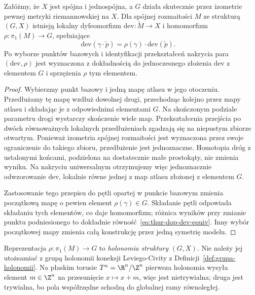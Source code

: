 \begin{twierdzenie}
\label{thm:thur-dop-dev-hol}
Załóżmy, że $X$ jest spójna i jednospójna, a $G$ działa
skutecznie przez izometrie pewnej metryki riemannowskiej
na $X$. Dla spójnej rozmaitości $M$ ze strukturą $(G,X)$
istnieją lokalny dyfeomorfizm
$\mathrm{dev}:\widetilde M\to X$ i homomorfizm
$\rho:\pi_1(M)\to G$, spełniające
\begin{equation}\label{eq:thur-dop-dev-equiv}
 \mathrm{dev}(\gamma\cdot\widetilde p)
 =\rho(\gamma)\cdot\mathrm{dev}(\widetilde p).
\end{equation}
Po wyborze punktów bazowych i identyfikacji przekształceń
nakrycia para $(\mathrm{dev},\rho)$ jest wyznaczona z dokładnością
do jednoczesnego złożenia $\mathrm{dev}$ z elementem $G$
i sprzężenia $\rho$ tym elementem.
\end{twierdzenie}
\begin{proof}
Wybierzmy punkt bazowy i jedną mapę atlasu w jego otoczeniu.
Przedłużamy tę mapę wzdłuż dowolnej drogi, przechodząc kolejno
przez mapy atlasu i składając je z odpowiednimi elementami $G$.
Na skończonym podziale parametru drogi wystarczy skończenie
wiele map. Przekształcenia przejścia po dwóch równoważnych
lokalnych przedłużeniach zgadzają się na niepustym zbiorze
otwartym. Ponieważ izometria spójnej rozmaitości jest
wyznaczona przez swoje ograniczenie do takiego zbioru,
przedłużenie jest jednoznaczne. Homotopia dróg z ustalonymi
końcami, podzielona na dostatecznie małe prostokąty,
nie zmienia wyniku. Na nakryciu uniwersalnym otrzymujemy
więc jednoznacznie odwzorowanie $\mathrm{dev}$, lokalnie
równe jednej z map atlasu złożonej z elementem $G$.

Zastosowanie tego przepisu do pętli opartej w punkcie
bazowym zmienia początkową mapę o pewien element
$\rho(\gamma)\in G$. Składanie pętli odpowiada składaniu
tych elementów, co daje homomorfizm; różnica wyników
przy zmianie punktu podniesionego to dokładnie
równość~\eqref{eq:thur-dop-dev-equiv}. Inny wybór
początkowej mapy zmienia całą konstrukcję przez jedną
symetrię modelu.
\end{proof}

\begin{uwaga}
\label{uw:thur-dop-dwie-holonomie}
Reprezentacja $\rho:\pi_1(M)\to G$ to
\emph{holonomia struktury $(G,X)$}. Nie należy jej
utożsamiać z grupą holonomii koneksji Leviego-Civity
z Definicji~\ref{def:grupa-holonomii}. Na płaskim torusie
$T^n=\R^n/\Z^n$ pierwsza holonomia wysyła element
$m\in\Z^n$ na przesunięcie $x\mapsto x+m$, więc jest
nietrywialna; druga jest trywialna, bo pola współrzędne
schodzą do globalnej ramy równoległej.
\end{uwaga}

